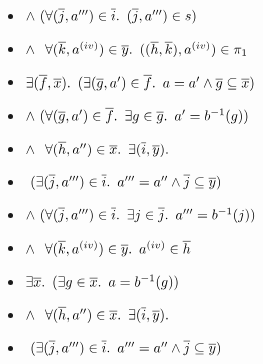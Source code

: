\begin{itemize}
  \item[\phantom{\imps}]
    \quad\quad\quad$\land~(\forall (\overline{j},a^{\prime\prime\prime})\in\overline{i}\ldotp~(\overline{j},a^{\prime\prime\prime})\in s)$

  \item[\phantom{\imps}]
    \quad\quad\quad$\land~\phantom{(}\forall (\overline{k},a^{\text (iv)})\in\overline{y}\ldotp~((\overline{h}, \overline{k}),a^{\text (iv)})\in\pi_1$
  \addtolength{\itemsep}{.5\baselineskip}

  \item[\iffs]
    $\exists (\overline{f},\overline{x})\ldotp~(\exists(\overline{g},a^\prime)\in\overline{f}\ldotp~a=a^\prime\land\overline{g}\subseteq\overline{x})$

  \addtolength{\itemsep}{-.5\baselineskip}
  \item[\phantom{\imps}]
    \quad $\land~(\forall (\overline{g},a^\prime)\in\overline{f}\ldotp~\exists g\in\overline{g}\ldotp~a^\prime = b^{-1}(g))$
  \item[\phantom{\imps}]
    \quad $\land~\phantom{(}\forall(\overline{h},a^{\prime\prime})\in\overline{x}\ldotp~\exists(\overline{i},\overline{y})\ldotp$

  \item[\phantom{\imps}]
    \quad\quad\quad\phantom{$\land$}$~(\exists (\overline{j},a^{\prime\prime\prime})\in\overline{i}\ldotp~a^{\prime\prime\prime} = a^{\prime\prime}\land\overline{j}\subseteq\overline{y})$

  \item[\phantom{\imps}]
    \quad\quad\quad$\land~(\forall (\overline{j},a^{\prime\prime\prime})\in\overline{i}\ldotp~\exists j\in\overline{j}\ldotp~a^{\prime\prime\prime}=b^{-1}(j))$

  \item[\phantom{\imps}]
    \quad\quad\quad$\land~\phantom{(}\forall (\overline{k},a^{\text (iv)})\in\overline{y}\ldotp~a^{\text (iv)}\in\overline{h}$
  \addtolength{\itemsep}{.5\baselineskip}

  \item[\iffs]
    $\exists \overline{x}\ldotp~(\exists g\in\overline{x}\ldotp~a = b^{-1}(g))$

  \addtolength{\itemsep}{-.5\baselineskip}
  \item[\phantom{\imps}]
    \quad $\land~\phantom{(}\forall(\overline{h},a^{\prime\prime})\in\overline{x}\ldotp~\exists(\overline{i},\overline{y})\ldotp$

  \item[\phantom{\imps}]
    \quad\quad\quad\phantom{$\land$}$~(\exists (\overline{j},a^{\prime\prime\prime})\in\overline{i}\ldotp~a^{\prime\prime\prime} = a^{\prime\prime}\land\overline{j}\subseteq\overline{y})$


\end{itemize}
